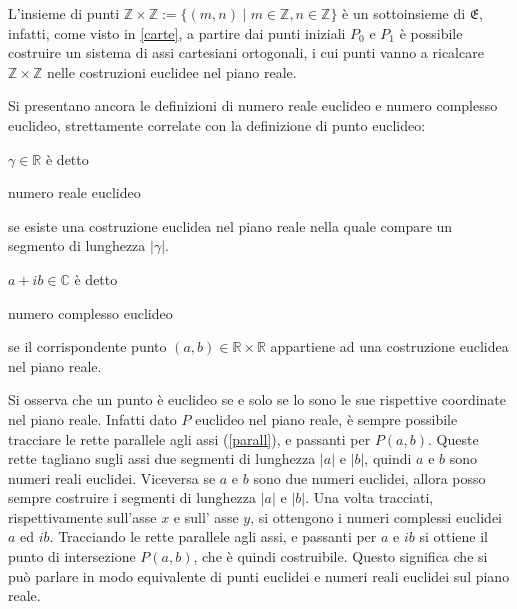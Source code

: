 \begin{osservazione} \label{osservaz}
L'insieme di punti $\mathbb{Z}\times \mathbb{Z} := \{(m,n) \mid m \in \mathbb{Z}, n \in \mathbb{Z}\}$ è un sottoinsieme di $\mathfrak{E}$, infatti, come visto in \ref{carte}, a partire dai punti iniziali $P_0$ e $P_1$ è possibile costruire un sistema di assi cartesiani ortogonali, i cui punti vanno a ricalcare $\mathbb{Z}\times \mathbb{Z}$ nelle costruzioni euclidee nel piano reale.
\end{osservazione}

Si presentano ancora le definizioni di numero reale euclideo e numero complesso euclideo, strettamente correlate con la definizione di punto euclideo:

\begin{definizione}
$\gamma \in \mathbb{R}$ è detto \begin{bfseries}numero reale euclideo\end{bfseries} se esiste una costruzione euclidea nel piano reale nella quale compare un segmento di lunghezza $|\gamma|$.
\end{definizione}

\begin{definizione}
$a + i b \in \mathbb{C}$ è detto \begin{bfseries}numero complesso euclideo\end{bfseries} se il corrispondente punto $(a, b) \in \mathbb{R}\times\mathbb{R}$ appartiene ad una costruzione euclidea nel piano reale.
\end{definizione}

\begin{osservazione}
Si osserva che un punto è euclideo se e solo se lo sono le sue rispettive coordinate nel piano reale. Infatti dato $P$ euclideo nel piano reale, è sempre possibile tracciare le rette parallele agli assi (\ref{parall}), e passanti per $P(a, b)$. Queste rette tagliano sugli assi due segmenti di lunghezza $|a|$ e $|b|$, quindi $a$ e $b$ sono numeri reali euclidei. Viceversa se $a$ e $b$ sono due numeri euclidei, allora posso sempre costruire i segmenti di lunghezza $|a|$ e $|b|$. Una volta tracciati, rispettivamente sull'asse $x$ e sull' asse $y$, si ottengono i numeri complessi euclidei $a$ ed $ ib$. Tracciando le rette parallele agli assi, e passanti per $a$ e $ ib$ si ottiene il punto di intersezione $P(a,b)$, che è quindi costruibile. 
Questo significa che si può parlare in modo equivalente di punti euclidei e numeri reali euclidei sul piano reale.
\end{osservazione}

